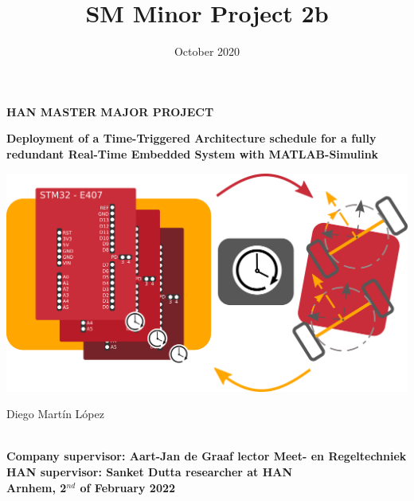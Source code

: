 \documentclass[table,xcdraw]{article}
\title{SM Minor Project 2b}
\author{}
\date{October 2020}
\begin{document}

\begin{minipage}{\linewidth}
	\begin{flushright}
			\textbf{HAN MASTER MAJOR PROJECT}\\
	\end{flushright}
			\vspace{20pt}
	\begin{center}
			\LARGE\textbf{Deployment of a Time-Triggered Architecture schedule for a fully redundant Real-Time Embedded System with MATLAB-Simulink}\\
	\end{center}
	\vspace{5pt}
    \includegraphics[width = \linewidth]{figures/frontmatter.png}
	\vspace{5pt}
	\begin{center}
			\Large{Diego Martín López \\}
			
            \vspace{20pt}
            \Large\textbf{
			\\Company supervisor: Aart-Jan de Graaf \textendash lector Meet- en Regeltechniek
			\\HAN supervisor: Sanket Dutta \textendash researcher at HAN
			\vspace{5pt}
			\\Arnhem, 2$^{nd}$ of February 2022}
	\end{center}
	\vspace{30pt}
\end{minipage}
\end{document}
